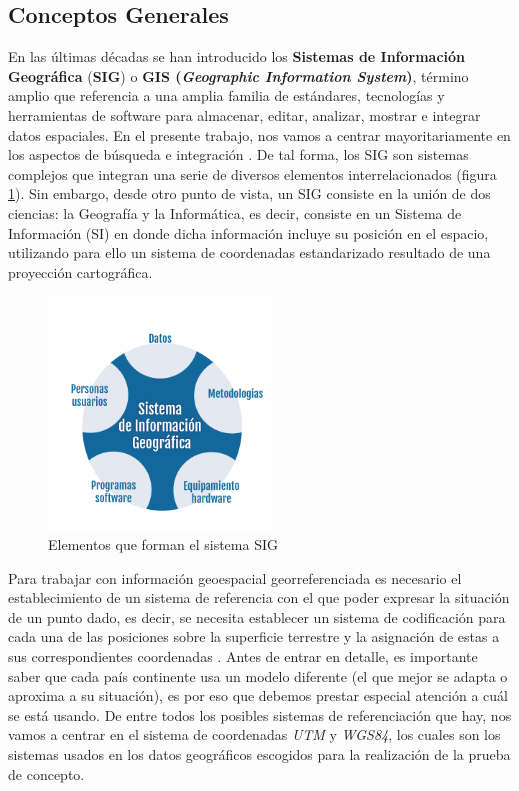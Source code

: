 

\subsection{Conceptos Generales}

En las últimas décadas se han introducido los \textbf{Sistemas de Información Geográfica} (\textbf{SIG}) o \textbf{GIS (\textit{Geographic Information System})}, término amplio que referencia a una amplia familia de estándares, tecnologías y herramientas de software para almacenar, editar, analizar, mostrar e integrar datos espaciales. En el presente trabajo, nos vamos a centrar mayoritariamente en los aspectos de búsqueda e integración \cite{tesis}. De tal forma, los SIG son sistemas complejos que integran una serie de diversos elementos interrelacionados \cite{VictorOlaya} (figura \ref{fig:elementosSIG}). Sin embargo, desde otro punto de vista, un SIG consiste en la unión de dos ciencias: la Geografía y la Informática, es decir, consiste en un Sistema de Información (SI) en donde dicha información incluye su posición en el espacio, utilizando para ello un sistema de coordenadas estandarizado resultado de una proyección cartográfica. 

\begin{figure}[H]
	\centering
	\includegraphics[width=0.53\textwidth]{imagenes/capitulo2/graficoSig}
	\caption{Elementos que forman el sistema SIG}
	\label{fig:elementosSIG}
\end{figure}

Para trabajar con información geoespacial georreferenciada es necesario el establecimiento de un sistema de referencia con el que poder expresar la situación de un punto dado, es decir, se necesita establecer un sistema de codificación para cada una de las posiciones sobre la superficie terrestre y la asignación de estas a sus correspondientes coordenadas \cite{VictorOlaya}. Antes de entrar en detalle, es importante saber que cada país  continente usa un modelo diferente (el que mejor se adapta o aproxima a su situación), es por eso que debemos prestar especial atención a cuál se está usando. De entre todos los posibles sistemas de referenciación que hay, nos vamos a centrar en el sistema de coordenadas \textit{UTM} y \textit{WGS84}, los cuales son los sistemas usados en los datos geográficos escogidos para la realización de la prueba de concepto.

